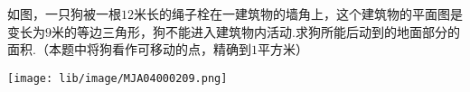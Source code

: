 如图，一只狗被一根$12$米长的绳子栓在一建筑物的墙角上，这个建筑物的平面图是变长为$9$米的等边三角形，狗不能进入建筑物内活动.求狗所能后动到的地面部分的面积.（本题中将狗看作可移动的点，精确到$1$平方米）

\begin{center}
    \texttt{[image: lib/image/MJA04000209.png]}
\end{center}